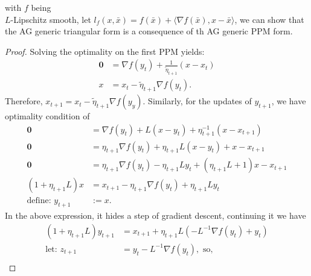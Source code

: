 \documentclass[12pt]{article}
\begin{document}
            \begin{proposition}
                \label{prop:tri_form_via_ppm}
                with $f$ being \\
                $L$-Lipschitz smooth, 
                let $l_f(x, \bar x) = f(\bar x) + \langle \nabla f(\bar x), x - \bar x\rangle$, we can show that the AG generic triangular form is a consequence of th AG generic PPM form. 
            \end{proposition}
            \begin{proof}
                Solving the optimality on the first PPM yields: 
                \begin{align*}
                    \mathbf 0 &= \nabla f(y_t) + 
                    \frac{1}{\tilde \eta_{t + 1}} (x - x_t)
                    \\
                    x &= x_t - \tilde \eta_{t + 1} \nabla f(y_t).
                \end{align*}
                Therefore, $x_{t + 1} = x_t - \tilde \eta_{t + 1}\nabla f(y_y)$. 
                Similarly, for the updates of $y_{t + 1}$, we have optimality condition of 
                \begin{align*}
                    \mathbf 0 &= \nabla f (y_t) + L (x - y_t) + \eta_{t + 1}^{-1} (x - x_{t + 1})
                    \\
                    \mathbf 0 &= \eta_{t + 1}\nabla f (y_t) + \eta_{t + 1}L (x - y_t) + x - x_{t + 1}
                    \\
                    \mathbf 0 &= 
                    \eta_{t + 1}\nabla f(y_t) -\eta_{t + 1} Ly_t + (\eta_{t + 1}L + 1)x - x_{t + 1}
                    \\
                    (1 + \eta_{t + 1}L)x
                    &= 
                    x_{t + 1} - \eta_{t + 1}\nabla f(y_t) + \eta_{t + 1}L y_t
                    \\
                    \text{define: } y_{t + 1} &:= x. 
                \end{align*}
                In the above expression, it hides a step of gradient descent, continuing it we have 
                \begin{align*}
                    (1 + \eta_{t + 1}L)y_{t + 1} &= 
                    x_{t + 1}  + \eta_{t + 1}L (-L^{-1}\nabla f(y_t) + y_t)
                    \\
                    \text{let: } z_{t + 1} &= y_t - L^{-1}\nabla f(y_t), \text{ so, }
                    \\

\end{align*}
\end{proof}
\end{document}
